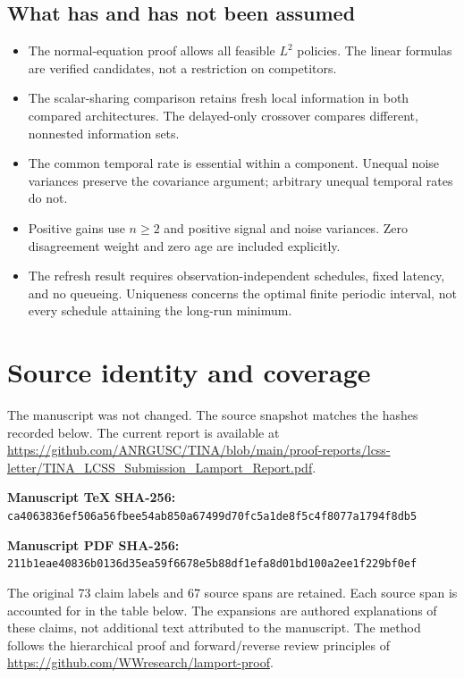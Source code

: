 \documentclass[12pt,letterpaper]{article}
\begin{document}
\subsection{What has and has not been assumed}
\begin{itemize}
\item The normal-equation proof allows all feasible $L^2$ policies. The linear formulas are verified candidates, not a restriction on competitors.
\item The scalar-sharing comparison retains fresh local information in both compared architectures. The delayed-only crossover compares different, nonnested information sets.
\item The common temporal rate is essential within a component. Unequal noise variances preserve the covariance argument; arbitrary unequal temporal rates do not.
\item Positive gains use $n\ge2$ and positive signal and noise variances. Zero disagreement weight and zero age are included explicitly.
\item The refresh result requires observation-independent schedules, fixed latency, and no queueing. Uniqueness concerns the optimal finite periodic interval, not every schedule attaining the long-run minimum.
\end{itemize}


\clearpage
\appendix
\section{Source identity and coverage}
The manuscript was not changed. The source snapshot matches the hashes recorded below. The current report is available at
\url{https://github.com/ANRGUSC/TINA/blob/main/proof-reports/lcss-letter/TINA_LCSS_Submission_Lamport_Report.pdf}.

\textbf{Manuscript TeX SHA-256:}\\
\nolinkurl{ca4063836ef506a56fbee54ab850a67499d70fc5a1de8f5c4f8077a1794f8db5}

\textbf{Manuscript PDF SHA-256:}\\
\nolinkurl{211b1eae40836b0136d35ea59f6678e5b88df1efa8d01bd100a2ee1f229bf0ef}

The original 73 claim labels and 67 source spans are retained. Each source span is accounted for in the table below. The expansions are authored explanations of these claims, not additional text attributed to the manuscript. The method follows the hierarchical proof and forward/reverse review principles of
\url{https://github.com/WWresearch/lamport-proof}.
\end{document}
